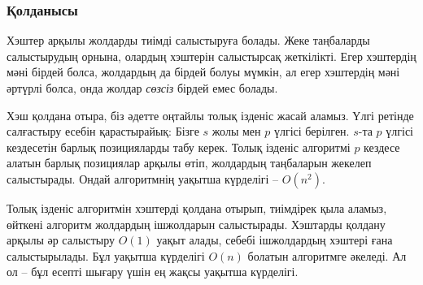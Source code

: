 
\subsubsection*{Қолданысы}

Хэштер арқылы жолдарды тиімді салыстыруға болады. 
Жеке таңбаларды салыстырудың орнына, олардың хэштерін
салыстырсақ жеткілікті. Егер хэштердің мәні бірдей болса,
жолдардың да бірдей болуы мүмкін, ал егер хэштердің мәні әртүрлі болса,
онда жолдар \emph{сөзсіз} бірдей емес болады. 


Хэш қолдана отыра, біз әдетте оңтайлы толық ізденіс  
жасай аламыз. Үлгі ретінде
салғастыру есебін қарастырайық: Бізге $s$ жолы мен
$p$ үлгісі берілген. $s$-та $p$ үлгісі кездесетін 
барлық позицияларды табу керек. Толық ізденіс алгоритмі
$p$ кездесе алатын барлық позициялар арқылы өтіп,
жолдардың таңбаларын жекелеп салыстырады. Ондай алгоритмнің
уақытша күрделігі -- $O(n^2)$.


Толық ізденіс алгоритмін хэштерді қолдана отырып, тиімдірек 
қыла аламыз, өйткені алгоритм жолдардың ішжолдарын салыстырады. 
Хэштарды қолдану арқылы әр салыстыру $O(1)$ уақыт алады, себебі
ішжолдардың хэштері ғана салыстырылады. Бұл уақытша 
күрделігі $O(n)$ болатын алгоритмге әкеледі. Ал ол --
бұл есепті шығару үшін ең жақсы уақытша күрделігі. 


